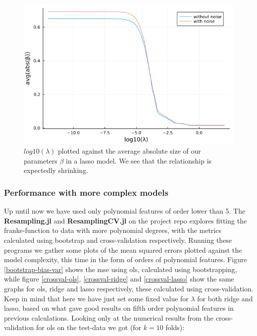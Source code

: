 \documentclass{article}
\begin{document}
\begin{figure}
    \centerline{\includegraphics[scale=0.5]{lasso_beta_size}}
    \caption{$log10(\lambda)$ plotted against the average absolute size of our parameters $\beta$ in a lasso model. We see that the relationship is expectedly shrinking.}
    \label{Lasso-beta-sizes}
\end{figure}

\subsubsection{Performance with more complex models}
Up until now we have used only polynomial features of order lower than 5. The
\textbf{Resampling.jl} and \textbf{ResamplingCV.jl} on the project repo
\cite{githubrepoproject1} explores fitting the franke-function to data with more
polynomial degrees, with the metrics calculated using bootstrap and
cross-validation respectively. Running these programs we gather some plots of
the mean squared errors plotted against the model complexity, this time in the
form of orders of polynomial features. Figure \ref{bootstrap-bias-var} shows the
mse using ols, calculated using bootstrapping, while figure \ref{crossval-ols},
\ref{crossval-ridge} and \ref{crossval-lasso} show the same graphs for ols,
ridge and lasso respectively, these calculated using cross-validation. Keep in
mind that here we have just set some fixed value for $\lambda$ for both ridge
and lasso, based on what gave good results on fifth order polynomial features in
previous calculations. Looking only at the numerical results from the
cross-validation for ols on the test-data we got (for $k=10$ folds):

\begin{table}[htpb!]




\end{table}
\end{document}
